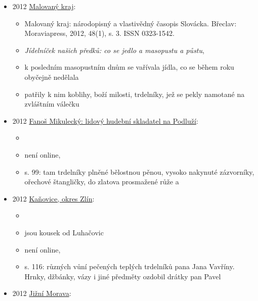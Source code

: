 \begin{itemize}
  \begin{itemize}
  \tightlist
  \item
    překlad rakouské knihy o historkách ze života Habsburků
  \item
    s. 149, kapitola Vánoce v círařské rodině:

    \begin{itemize}
    \tightlist
    \item
      pod stromečkem měli trdelníky a sušené ovoce
    \item
      předpokládám, že to byl prügelkrapfen z litýho těsta
    \end{itemize}
  \end{itemize}
\item
  2012
  \href{https://ndk.cz/uuid/uuid:1d710260-efa3-11e3-adbd-5ef3fc9bb22f}{Malovaný
  kraj}:

  \begin{itemize}
  \tightlist
  \item
    Malovaný kraj: národopisný a vlastivědný časopis Slovácka. Břeclav:
    Moraviapress, 2012, 48(1), s. 3. ISSN 0323-1542.
  \item
    \emph{Jídelníček našich předků: co se jedlo a masopustu a půstu},
  \item
    k posledním masopustním dnům se vařívala jídla, co se během roku
    obyčejně nedělala
  \item
    patřily k nim koblihy, boží milosti, trdelníky, jež se pekly
    namotané na zvláštním válečku
  \end{itemize}
\item
  2012
  \href{https://www.digitalniknihovna.cz/mzk/uuid/uuid:f3c177a0-1ba0-11e8-a0cf-005056827e52}{Fanoš
  Mikulecký: lidový hudební skladatel na Podluží}:

  \begin{itemize}
  \tightlist
  \item
  \item
    není online, 
  \item
    s. 99: tam trdelníky plněné bělostnou pěnou, vysoko nakynuté
    zázvorníky, ořechové štangličky, do zlatova prosmažené růže a
  \end{itemize}
\item
  2012
  \href{https://www.digitalniknihovna.cz/mzk/uuid/uuid:303b2a10-a2ba-11e7-ae0a-005056827e52}{Kaňovice,
  okres Zlín}:

  \begin{itemize}
  \tightlist
  \item
  \item
     jsou kousek od Luhačovic
  \item
    není online, 
  \item
    s. 116: různých vůní pečených teplých trdelníků pana Jana Vavříny.
    Hrnky, džbánky, vázy i jiné předměty ozdobil drátky pan Pavel
  \end{itemize}
\item
  2012
  \href{https://www.digitalniknihovna.cz/mzk/uuid/uuid:b12b9ba0-d83c-11e4-97af-005056827e51}{Jižní
  Morava}:


\end{itemize}
